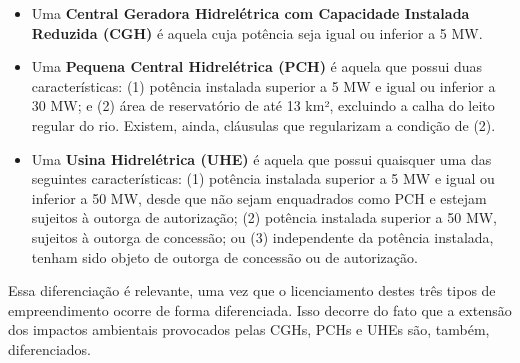 \documentclass[grad,numbers]{coppe}
\providecommand{\tightlist}{%
  \setlength{\itemsep}{0pt}\setlength{\parskip}{0pt}}
\begin{document}
  \begin{itemize}
  \tightlist
  \item
    Uma \textbf{Central Geradora Hidrelétrica com Capacidade Instalada Reduzida (CGH)} é aquela cuja potência seja igual ou inferior a 5 MW.
  \item
    Uma \textbf{Pequena Central Hidrelétrica (PCH)} é aquela que possui duas características: (1) potência instalada superior a 5 MW e igual ou inferior a 30 MW; e (2) área de reservatório de até 13 km², excluindo a calha do leito regular do rio. Existem, ainda, cláusulas que regularizam a condição de (2).
  \item
    Uma \textbf{Usina Hidrelétrica (UHE)} é aquela que possui quaisquer uma das seguintes características: (1) potência instalada superior a 5 MW e igual ou inferior a 50 MW, desde que não sejam enquadrados como PCH e estejam sujeitos à outorga de autorização; (2) potência instalada superior a 50 MW, sujeitos à outorga de concessão; ou (3) independente da potência instalada, tenham sido objeto de outorga de concessão ou de autorização.
  \end{itemize}
  Essa diferenciação é relevante, uma vez que o licenciamento destes três tipos de empreendimento ocorre de forma diferenciada. Isso decorre do fato que a extensão dos impactos ambientais provocados pelas CGHs, PCHs e UHEs são, também, diferenciados.
\end{document}
